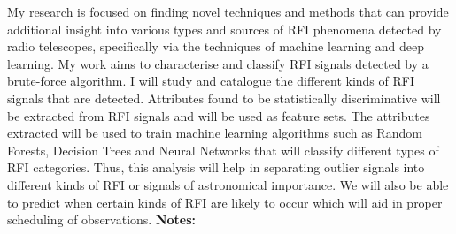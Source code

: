 \documentclass{report}
\begin{document}
{{{{{{{{{{{{{{{{{{{{{{{{{{{{{{{{{{{{{{{{{{{{{{{{{{{{{{{{{{{{{{{{{{{{{{{{{{{{{{{{{{{{{{{{{{{{{{{{{{{{{{{{{{{{{{{{{{{{{{{{{{{{{{{{{{{{{{{{{{{{{{{{{{{{{{{{{{{{{{{{{{{{{{{{My research is focused on finding novel techniques and methods that can provide additional insight into various types and sources of RFI phenomena detected by radio telescopes, specifically via the techniques of machine learning and deep learning. My work aims to characterise and classify RFI signals detected by a brute-force algorithm. I will study and catalogue the different kinds of RFI signals that are detected. Attributes found to be statistically discriminative will be extracted from RFI signals and will be used as feature sets. The attributes extracted will be used to train machine learning algorithms such as Random Forests, Decision Trees and Neural Networks that will classify different types of RFI categories. Thus,
this analysis will help in separating outlier signals into different kinds of RFI or signals of astronomical importance. We will also be able to predict when certain kinds of RFI are likely to occur which will aid in proper scheduling of observations.\newline
{\bf Notes:}\newline
{\newpage
}}}}}}}}}}}}}}}}}}}}}}}}}}}}}}}}}}}}}}}}}}}}}}}}}}}}}}}}}}}}}}}}}}}}}}}}}}}}}}}}}}}}}}}}}}}}}}}}}}}}}}}}}}}}}}}}}}}}}}}}}}}}}}}}}}}}}}}}}}}}}}}}}}}}}}}}}}}}}}}}}}}}}}}}}
\end{document}
